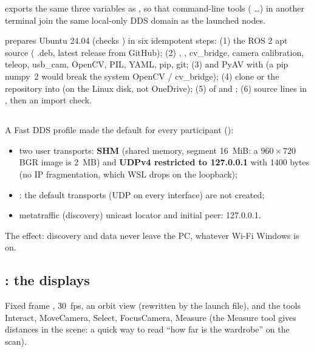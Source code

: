 \textbf{} exports the same three variables as , so that command-line
tools ( \dots) in another terminal join the same local-only DDS domain as the launched
nodes.

\textbf{} prepares Ubuntu 24.04 (checks ) in six idempotent steps:
(1) the ROS 2 apt source ( .deb, latest release from GitHub); (2) ,
, cv\_bridge, camera calibration, teleop, usb\_cam, OpenCV, PIL, YAML, pip, git; (3)
 and PyAV with  (a pip numpy~2 would break the system OpenCV /
cv\_bridge); (4) clone or  the repository into  (on the Linux
disk, not OneDrive); (5)  of  and ;
(6) source lines in , then an import check.

\subsection{\texorpdfstring{}{fastdds\_local.xml}}
A Fast DDS profile made the default for every participant ():
\begin{itemize}[nosep]
\item two user transports: \textbf{SHM} (shared memory, segment 16~MiB: a $960\times720$ BGR image is 2~MB) and
  \textbf{UDPv4 restricted to 127.0.0.1} with  1400 bytes (no IP fragmentation, which WSL
  drops on the loopback);
\item {}: the default transports (UDP on every interface) are not created;
\item metatraffic (discovery) unicast locator and initial peer: 127.0.0.1.
\end{itemize}
The effect: discovery and data never leave the PC, whatever Wi-Fi Windows is on.

\subsection{\texorpdfstring{}{real.rviz}: the displays}
Fixed frame , 30~fps, an orbit view (rewritten by the launch file), and the tools Interact, MoveCamera,
Select, FocusCamera, Measure (the Measure tool gives distances in the scene: a quick way to read ``how far is
the wardrobe'' on the scan).

